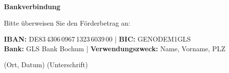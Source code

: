 \documentclass[11pt]{article}
\newcommand{\hint}[1]{{\footnotesize\color{gray}#1}}
\begin{document}
\textbf{Bankverbindung}

Bitte überweisen Sie den Förderbetrag an:

\textbf{IBAN:} DE83\,4306\,0967\,1323\,6039\,00 | \textbf{BIC:} GENODEM1GLS\\ \textbf{Bank:} GLS Bank Bochum | \textbf{Verwendungszweck:} Name, Vorname, PLZ

\vspace{1.5cm}

\begin{minipage}{\textwidth}
   \hint{(Ort, Datum)} \hfill \hint{(Unterschrift)}
\end{minipage}
\end{document}
